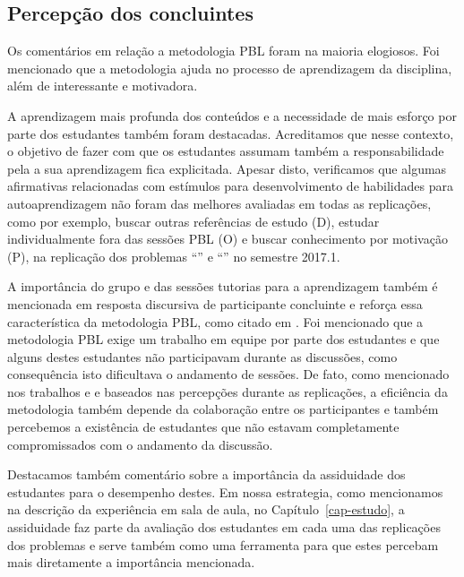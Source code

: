\subsection{Percepção dos concluintes}

Os comentários em relação a metodologia PBL foram na maioria elogiosos.
Foi mencionado que a metodologia ajuda no processo de aprendizagem da
disciplina, além de interessante e motivadora.

A aprendizagem mais profunda dos conteúdos e a necessidade de mais
esforço por parte dos estudantes também foram destacadas.
Acreditamos que nesse contexto, o objetivo de fazer com que
os estudantes assumam também a responsabilidade pela a
sua aprendizagem fica explicitada.
Apesar disto, verificamos que algumas afirmativas relacionadas
com estímulos para desenvolvimento de habilidades para autoaprendizagem
não foram das melhores avaliadas em todas as replicações,
como por exemplo, buscar outras referências de estudo (D),
estudar individualmente fora das sessões PBL (O) e buscar
conhecimento por motivação (P), na replicação dos
problemas ``\ProblemaG'' e ``\ProblemaB'' no semestre 2017.1.

A importância do grupo e das sessões tutorias para a aprendizagem
também é mencionada em resposta discursiva de participante concluinte
e reforça essa característica da metodologia PBL, como citado
em \cite{van2000motivation}.
Foi mencionado que a metodologia PBL exige um trabalho em equipe por
parte dos estudantes e que alguns destes estudantes não participavam
durante as discussões, como consequência isto dificultava o
andamento de sessões.
De fato, como mencionado nos
trabalhos \cite{savery2015overview} e \cite{albanese2010problem}
e baseados nas percepções durante as replicações, a eficiência da metodologia
também depende da colaboração entre os participantes e
também percebemos a existência de estudantes que não estavam
completamente compromissados com o andamento da discussão.

Destacamos também comentário sobre a importância da assiduidade dos
estudantes para o desempenho destes.
Em nossa estrategia, como mencionamos na descrição da experiência
em sala de aula, no Capítulo~\ref{cap-estudo}, a assiduidade faz
parte da avaliação dos estudantes em cada uma das replicações dos
problemas e serve também como uma ferramenta para que estes
percebam mais diretamente a importância mencionada.

